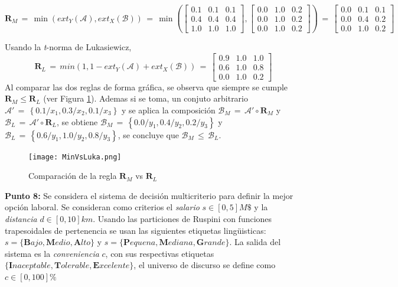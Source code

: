 \documentclass[10pt,onecolumn,twoside,letterpaper]{article}
\begin{document}
\begin{equation*}
  \mathbf{R}_M \,=\,\min(ext_Y(\mathcal{A}),ext_X(\mathcal{B}))\,=\,\min\left(\left[
  \begin{array}{ccc}
    0.1&0.1&0.1\\
    0.4&0.4&0.4\\
    1.0&1.0&1.0
  \end{array}\right],\left[
  \begin{array}{ccc}
    0.0&1.0&0.2\\
    0.0&1.0&0.2\\
    0.0&1.0&0.2
  \end{array}\right]\right)\,=\,
\left[
  \begin{array}{ccc}
    0.0&0.1&0.1\\
    0.0&0.4&0.2\\
    0.0&1.0&0.2
  \end{array}
\right]
\end{equation*}
\par Usando la \emph{t}-norma de Lukasiewicz,
\begin{equation*}
  \mathbf{R}_L \,=\,min(1,1-ext_Y(\mathcal{A})+ext_X(\mathcal{B}))\,=\,
\left[
  \begin{array}{ccc}
    0.9&1.0&1.0\\
    0.6&1.0&0.8\\
    0.0&1.0&0.2  
  \end{array}
\right]
\end{equation*}
Al comparar las dos reglas de forma gr\'afica, se observa que siempre se cumple $\mathbf{R}_M\leq\mathbf{R}_L$ (ver Figura \ref{fig:MinVsLuka}). Ademas si se toma, un conjuto arbitrario $\mathcal{A}'\,=\,\left\{0.1/x_1,0.3/x_2,0.1/x_3\right\}$ y se aplica la composici\'on $\mathcal{B}_M\,=\,\mathcal{A}'\circ\mathbf{R}_M$ y $\mathcal{B}_L\,=\,\mathcal{A}'\circ\mathbf{R}_L$, se obtiene $\mathcal{B}_M\,=\,\left\{0.0/y_1,0.4/y_2,0.2/y_3\right\}$ y $\mathcal{B}_L\,=\,\left\{0.6/y_1,1.0/y_2,0.8/y_3\right\}$, se concluye que $\mathcal{B}_M\,\leq\,\mathcal{B}_L$.
\begin{figure}[H]
 \centering
 \texttt{[image: MinVsLuka.png]}
 \caption{Comparaci\'on de la regla $\mathbf{R}_M$ vs $\mathbf{R}_L$}
 \label{fig:MinVsLuka}
\end{figure}
\par{\bf \large Punto 8:} Se considera el sistema de decisi\'on multicriterio para definir la mejor opci\'on laboral. Se consideran como criterios el \emph{salario} $s\in[0,5]M\$$ y la \emph{distancia} $d\in[0,10]km$. Usando las particiones de Ruspini con funciones trapesoidales de pertenencia se usan las siguientes etiquetas ling\"uisticas: $s=\{\mathbf{B}ajo,\mathbf{M}edio,\mathbf{A}lto\}$ y $s=\{\mathbf{P}equena,\mathbf{M}ediana,\mathbf{G}rande\}$. La salida del sistema es la \emph{conveniencia} $c$, con sus respectivas etiquetas $\{\mathbf{I}naceptable,\mathbf{T}olerable,\mathbf{E}xcelente\}$, el universo de discurso se define como $c\in[0,100]\%$\\
\end{document}
